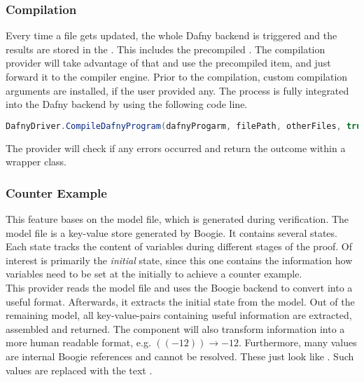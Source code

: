 \subsubsection{Compilation}
Every time a file gets updated, the whole Dafny backend is triggered and the results are stored in the .
This includes the precompiled .
The compilation provider will take advantage of that and use the precompiled item, and just forward it to the compiler engine.
Prior to the compilation, custom compilation arguments are installed, if the user provided any.
The process is fully integrated into the Dafny backend by using the following code line.\\

\begin{lstlisting}[language=csharp, caption={Calling the Dafny Compiler}, captionpos=b, label={lst:dafnycompiler}]
DafnyDriver.CompileDafnyProgram(dafnyProgarm, filePath, otherFiles, true, textwriter);
\end{lstlisting}

The provider will check if any errors occurred and return the outcome within a wrapper class.

\subsubsection{Counter Example}
This feature bases on the model file, which is generated during verification.
The model file is a key-value store generated by Boogie.
It contains several states.
Each state tracks the content of variables during different stages of the proof.
Of interest is primarily the \textit{initial} state, since this one contains the information how variables need to be set at the initially to achieve a counter example.\\

This provider reads the model file and uses the Boogie backend to convert into a useful format.
Afterwards, it extracts the initial state from the model.
Out of the remaining model, all key-value-pairs containing useful information are extracted, assembled and returned.
The component will also transform information into a more human readable format, e.g. $((- 12)) \rightarrow -12$.
Furthermore, many values are internal Boogie references and cannot be resolved.
These just look like .
Such values are replaced with the text .\\



